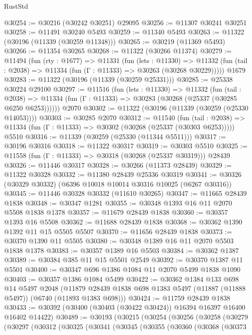 \begin{lexlean}{RustStd}
\begin{coremodule}
@30254 := @30216 (@30242 @30251) @29095
@30256 := @11307 @30241 @30251
@30258 := @11491 @30240 @5493
@30259 := @11340 @5493
@30263 := @11322 (@30196 (@11339 (@30259 @11348)))
@30265 := @30219 (@11369 @5493)
@30266 := @11354 @30265
@30268 := @11322 (@30266 @11374)
@30279 := @11494
    (fun (rty : @1677) =>
    @11331
      (fun (lets : @11330) =>
      @11332 (fun (tail : @2038) => @11334 (fun (Γ : @11333) => @30263 (@30268 @30229)))))
    @1679
@30283 := @11322 (@30196 (@11339 (@30259 @25331)))
@30285 := @25338 @30224 @29100
@30297 := @11516
    (fun (lets : @11330) =>
    @11332
      (fun (tail : @2038) =>
      @11334 (fun (Γ : @11333) => @30283 (@30268 (@25337 (@30285 @6250 @6253))))))
    @2070
@30302 := @11322 (@30196 (@11339 (@30259 (@25330 @14053))))
@30303 := @30285 @2070
@30312 := @11540
    (fun (tail : @2038) => @11334 (fun (Γ : @11333) => @30302 (@30268 (@25337 (@30303 @6253)))))
    @5510
@30316 := @11339 (@30259 (@25330 (@11344 @5511)))
@30317 := @30196 @30316
@30318 := @11322 @30317
@30319 := @30303 @5510
@30325 := @11558 (fun (Γ : @11333) => @30318 (@30268 (@25337 @30319))) @28439
@30326 := @11446 @30317
@30328 := @30266 (@11373 @28439)
@30329 := @11322 @30328
@30332 := @11380 @28439 @25336 @30319
@30341 := @30326 (@30329 @30332) (@6396 @10018 @10014 @30316 @10025 (@6267 @30316))
@30345 := @11446 @30328 @30332 (@11610 @30265)
@30347 := @11665 @28439 @1838
@30348 := @30347 @1281
@30355 := @30348 @1393 @16 @11 @2070 @5508 @1838 @1378
@30357 := @11679 @28439 @1838
@30360 := @30357 @1393 @16 @5508
@30362 := @11688 @28439 @1838
@30368 := @30362 @1390 @1392 @11 @15 @5505 @5507
@30370 := @11656 @28439 @1838
@30373 := @30370 @1390 @11 @5505
@30380 := @30348 @1389 @16 @11 @2070 @5503 @1838 @1378
@30383 := @30357 @1389 @16 @5503
@30384 := @30362 @1387
@30389 := @30384 @385 @11 @15 @5501 @2549
@30392 := @30370 @1387 @11 @5501
@30400 := @30347 @696 @1386 @1084 @11 @2070 @5499 @1838 @1090
@30403 := @30357 @1386 @1084 @5499
@30422 := @30362
    @1384
    @133
    @698
    @14
    @5497
    @2048
    (@11879 @28439 @1838 @698 @1383 @5497 (@11887 (@11888 @5497)) (@6740 (@11893 @1383 @698)))
@30424 := @11759 @28439 @1838
@30433 := @30392 (@30400 (@30403 (@30422 @30424)) @16394 @16397 @16400 @16402 @14422)
@30489 := @30193
    (@30215
      (@30254
        (@30256
          (@30258
            (@30279
              (@30297
                (@30312
                  (@30325
                    (@30341
                      (@30345
                        (@30355
                          (@30360
                            (@30368
                              (@30373

\end{coremodule}
\end{lexlean}
